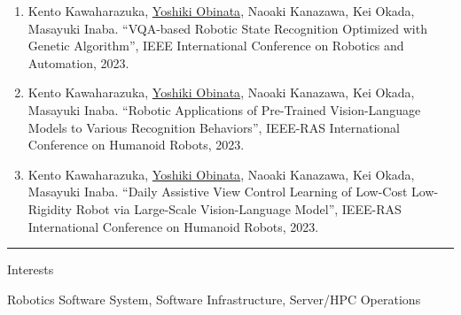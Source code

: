 \documentclass[a4paper,10pt]{article}
\newlength{\cvcolumngapwidth}
\newlength{\cvleftcolumnwidth}
\newlength{\cvrightcolumnwidth}
\newcommand{\cvsectionstyle}[1]{{\normalsize\cvsectionfont\textcolor{cvsectioncolor}{#1}}}
\newcommand{\cvheadingstyle}[1]{{\normalsize\cvheadingfont\textcolor{cvheadingcolor}{#1}}}
\newlength{\cvafteritemskipamount}
\newlength{\cvaftersectionskipamount}
\newlength{\cvbetweensectionandheadingextraskipamount}
\newlength{\cvparskip}
\newcommand{\cvsection}[1]{
    \begin{minipage}[t]{\cvleftcolumnwidth}
        \raggedleft\cvsectionstyle{#1}
    \end{minipage}%
    \hspace{\cvcolumngapwidth}%
    \begin{minipage}[t]{\cvrightcolumnwidth}
        \textcolor{cvrulecolor}{\rule{\cvrightcolumnwidth}{0.3mm}}
    \end{minipage}

    \vspace{\cvaftersectionskipamount}
}
\newcommand{\cvitem}[2]{
    \begin{minipage}[t]{\cvleftcolumnwidth}
        \raggedleft #1
    \end{minipage}%
    \hspace{\cvcolumngapwidth}%
    \begin{minipage}[t]{\cvrightcolumnwidth}
        \setlength{\parskip}{\cvparskip} #2
    \end{minipage}

    \vspace{\cvafteritemskipamount}
}
\begin{document}
{\begin{enumerate}
  \item Kento Kawaharazuka, \underline{Yoshiki Obinata}, Naoaki Kanazawa, Kei Okada, Masayuki Inaba. ``VQA-based Robotic State Recognition Optimized with Genetic Algorithm'', IEEE International Conference on Robotics and Automation, 2023.
  \item Kento Kawaharazuka, \underline{Yoshiki Obinata}, Naoaki Kanazawa, Kei Okada, Masayuki Inaba. ``Robotic Applications of Pre-Trained Vision-Language Models to Various Recognition Behaviors'', IEEE-RAS International Conference on Humanoid Robots, 2023.
  \item Kento Kawaharazuka, \underline{Yoshiki Obinata}, Naoaki Kanazawa, Kei Okada, Masayuki Inaba. ``Daily Assistive View Control Learning of Low-Cost Low-Rigidity Robot via Large-Scale Vision-Language Model'', IEEE-RAS International Conference on Humanoid Robots, 2023.
  \end{enumerate}
}


\cvsection{ADDITIONAL INFORMATION}

\vspace{\cvbetweensectionandheadingextraskipamount}


\cvitem{
    \cvheadingstyle{Interests}
}{
    Robotics Software System, Software Infrastructure, Server/HPC Operations
}
\end{document}
